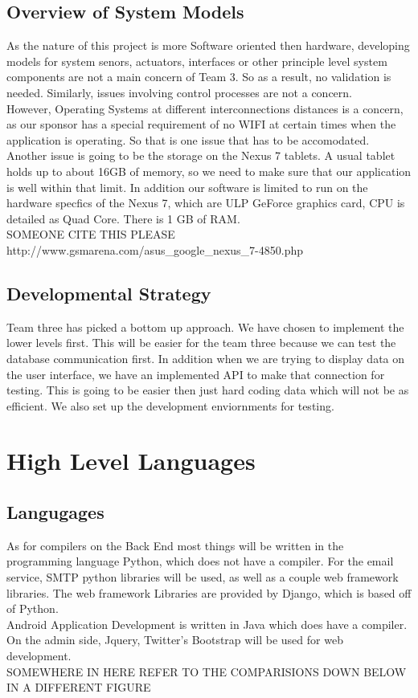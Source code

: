 \documentclass[Letter,11pt]{article}
\begin{document}
	\subsection{Overview of System Models}
	As the nature of this project is more Software oriented then hardware, developing models for system senors, actuators, interfaces or other principle level system components are not a main concern of Team 3. So as a result, no validation is needed. Similarly, issues involving control processes are not a concern. \\
	However, Operating Systems at different interconnections distances is a concern, as our sponsor has a special requirement of no WIFI at certain times when the application is operating. So that is one issue that has to be accomodated. Another issue is going to be the storage on the Nexus 7 tablets. A usual tablet holds up to about 16GB of memory, so we need to make sure that our application is well within that limit.  In addition our software is limited to run on the hardware specfics of the Nexus 7, which are ULP GeForce graphics card, CPU is detailed as Quad Core. There is 1 GB of RAM.   \\
	
	SOMEONE CITE THIS PLEASE http://www.gsmarena.com/asus_google_nexus_7-4850.php \\
	
	\subsection{Developmental Strategy}
	Team three has picked a bottom up approach. We have chosen to implement the lower levels first. This will be easier for the team three because we can test the database communication first. In addition when we are trying to display data on the user interface, we have an implemented API to make that connection for testing. This is going to be easier then just hard coding data which will not be as efficient.  We also set up the development enviornments for testing. 

\section{High Level Languages}\label{highlevel}
	\subsection{Langugages}
	As for compilers on the Back End most things will be written in the programming language Python, which does not have a compiler. For the email service, SMTP python libraries will be used, as well as a couple web framework libraries. The web framework Libraries are provided by Django, which is based off of Python. \\
	Android Application Development is written in Java which does have a compiler. On the admin side, Jquery, Twitter's Bootstrap will be used for web development.   \\ SOMEWHERE IN HERE REFER TO THE COMPARISIONS DOWN BELOW IN A DIFFERENT FIGURE
\end{document}
